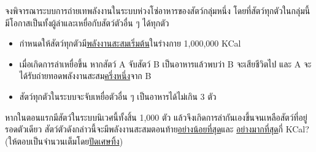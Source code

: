 \question{}

จงพิจารณาระบบการถ่ายเทพลังงานในระบบห่วงโซ่อาหารของสัตว์กลุ่มหนึ่ง 
โดยที่สัตว์ทุกตัวในกลุ่มนี้มีโอกาสเป็นทั้งผู้ล่าและเหยื่อกับสัตว์ตัวอื่น ๆ ได้ทุกตัว
\begin{itemize}
\item กำหนดให้สัตว์ทุกตัวมี\uline{พลังงานสะสมเริ่มต้น}ในร่างกาย 1,000,000 KCal
\item เมื่อเกิดการล่าเหยื่อขึ้น หากสัตว์ A จับสัตว์ B เป็นอาหารแล้วพบว่า B จะเสียชีวิตไป 
    และ A จะได้รับถ่ายทอดพลังงานสะสม\uline{ครึ่งหนึ่ง}จาก B\hrsp%
\item สัตว์ทุกตัวในระบบจะจับเหยื่อตัวอื่น ๆ เป็นอาหารได้ไม่เกิน 3 ตัว
\end{itemize}

หากในตอนแรกมีสัตว์ในระบบนิเวศนี้ทั้งสิ้น 1,000 ตัว แล้วจึงเกิดการล่ากันเองขึ้นจนเหลือสัตว์ที่อยู่รอดตัวเดียว 
สัตว์ตัวดังกล่าวนี้จะมีพลังงานสะสมตอนท้าย\uline{อย่างน้อยที่สุด}และ
\uline{อย่างมากที่สุด}กี่ KCal? ({\hrsp}ให้ตอบเป็นจำนวนเต็มโดย\uline{ปัดเศษทิ้ง}{\hrsp})
